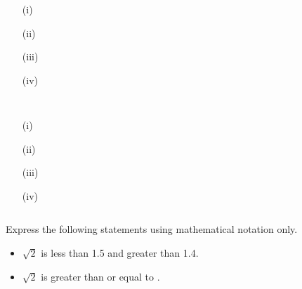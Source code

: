 
\begin{itemize}

\item[(i)]

\item[(ii)]

\item[(iii)]

\item[(iv)]

\end{itemize}

\begin{framed}
\begin{verbatim}


\end{verbatim}
\end{framed}
\newpage
\begin{itemize}

\item[(i)]

\item[(ii)]

\item[(iii)]

\item[(iv)]

\end{itemize}

\begin{framed}
\begin{verbatim}

\end{verbatim}
\end{framed}

\begin{frame}

Express the following statements using mathematical notation only.

\begin{itemize}
\item $\sqrt{2}$ is less than 1.5 and greater than 1.4.
\item $\sqrt{2}$ is greater than or equal to .
\end{itemize}

\end{frame}

